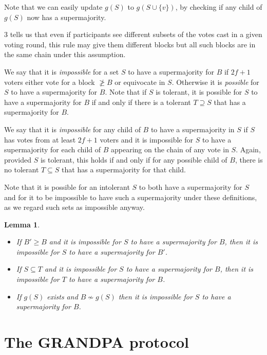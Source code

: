 \documentclass{article}
\newtheorem{lemma}[theorem]{Lemma}
\begin{document}
Note that we can easily update $g(S)$ to $g(S \cup \{v\})$, by checking if any child of $g(S)$ now has a supermajority.

3 tells us that even if participants see different subsets of the votes cast in a given voting round, this rule may give them different blocks but all such blocks are in the same chain under this assumption. 

We say that it is {\em impossible} for a set $S$ to have a supermajority for $B$ if $2f+1$ voters either vote for a block $\not \geq B$ or equivocate in $S$. Otherwise it is {\em possible} for $S$ to have a supermajority for $B$.
Note that if $S$ is tolerant, it is possible for $S$ to have a supermajority for $B$ if and only if there is a tolerant $T \supseteq S$ that has a supermajority for $B$.

We say that it is {\em impossible} for any child of $B$ to have a supermajority in $S$ if $S$ has votes from at least $2f+1$ voters and it is impossible for $S$ to have a supermajority for each child of $B$ appearing on the chain of any vote in $S$.
Again, provided $S$ is tolerant, this holds if and only if for any possible child of $B$, there is no tolerant $T \subseteq S$ that has a supermajority for that child.

Note that it is possible for an intolerant $S$ to both have a supermajority for $S$ and for it to be impossible to have such a supermajority under these definitions, as we regard such sets as impossible anyway.

\begin{lemma} \label{lem:impossible}
\begin{itemize}
\item[(i)] If $B' \geq B$ and it is impossible for $S$ to have a supermajority for $B$, then it is impossible for $S$ to have a supermajority for $B'$.
\item[(ii)] If $S \subseteq T$ and it is impossible for $S$ to have a supermajority for $B$, then it is impossible for $T$ to have a supermajority for $B$.
\item[(iii)] If $g(S)$ exists and $B \nsim g(S)$ then it is impossible for $S$ to have a supermajority for $B$.
\end{itemize}
\end{lemma}

\section{The GRANDPA protocol}
\end{document}
